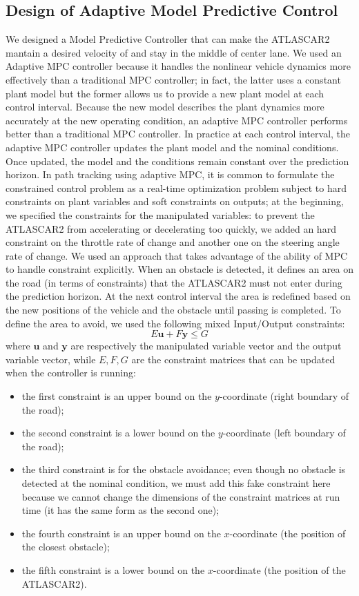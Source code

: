 \documentclass[conference, 11pt]{IEEEtran}
\begin{document}
\subsection{Design of Adaptive Model Predictive Control}
We designed a Model Predictive Controller that can make the ATLASCAR2 mantain a desired velocity of and stay in the middle of center lane. We used an Adaptive MPC controller because it handles the nonlinear vehicle dynamics more effectively than a traditional MPC controller; in fact, the latter uses a constant plant model but the former allows us to provide a new plant model at each control interval. Because the new model describes the plant dynamics more accurately at the new operating condition, an adaptive MPC controller performs better than a traditional MPC controller. In practice at each control interval, the adaptive MPC controller updates the plant model and the nominal conditions. Once updated, the model and the conditions remain constant over the prediction horizon. In path tracking using adaptive MPC, it is common to formulate the constrained control problem as a real-time optimization problem subject to hard constraints on plant variables and soft constraints on outputs; at the beginning, we specified the constraints for the manipulated variables: to prevent the ATLASCAR2 from accelerating or decelerating too quickly, we added an hard constraint on the throttle rate of change and another one on the steering angle rate of change. We used an approach that takes advantage of the ability of MPC to handle constraint explicitly. When an obstacle is detected, it defines an area on the road (in terms of constraints) that the ATLASCAR2 must not enter during the prediction horizon. At the next control interval the area is redefined based on the new positions of the vehicle and the obstacle until passing is completed.
To define the area to avoid, we used the following mixed Input/Output constraints:
\begin{equation*}
	\label{eqn:mixed_IO_constraints}
	E\textbf{u}+F\textbf{y}\leq G
\end{equation*}
where $\textbf{u}$ and $\textbf{y}$ are respectively the manipulated variable vector and the output variable vector, while $E,F,G$ are the constraint matrices that can be updated when the controller is running:
\begin{itemize}
	\item the first constraint is an upper bound on the $y$-coordinate (right boundary of the road);
	\item the second constraint is a lower bound on the $y$-coordinate (left boundary of the road);
	\item the third constraint is for the obstacle avoidance; even though no obstacle is detected at the nominal condition, we must add this fake constraint here because we cannot change the dimensions of the constraint matrices at run time (it has the same form as the second one);
	\item the fourth constraint is an upper bound on the $x$-coordinate (the position of the closest obstacle);
	\item the fifth constraint is a lower bound on the $x$-coordinate (the position of the ATLASCAR2).
\end{itemize}
\end{document}
